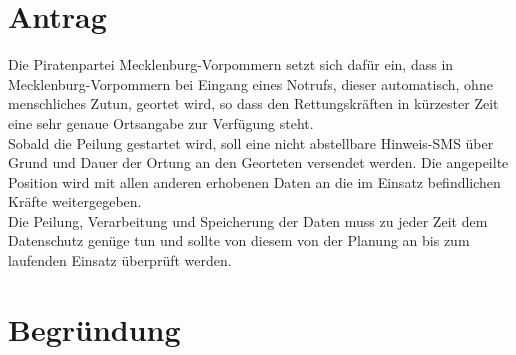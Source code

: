 \section{Antrag}

Die Piratenpartei Mecklenburg-Vorpommern setzt sich dafür ein, dass in Mecklenburg-Vorpommern bei Eingang eines Notrufs, dieser automatisch, ohne menschliches Zutun, geortet wird, so dass den Rettungskräften in kürzester Zeit eine sehr genaue Ortsangabe zur Verfügung steht.\\Sobald die Peilung gestartet wird, soll eine nicht abstellbare Hinweis-SMS über Grund und Dauer der Ortung an den Georteten versendet werden. Die angepeilte Position wird mit allen anderen erhobenen Daten an die im Einsatz befindlichen Kräfte weitergegeben.\\Die Peilung, Verarbeitung und Speicherung der Daten muss zu jeder Zeit dem Datenschutz genüge tun und sollte von diesem von der Planung an bis zum laufenden Einsatz überprüft werden.

\section{Begründung}

